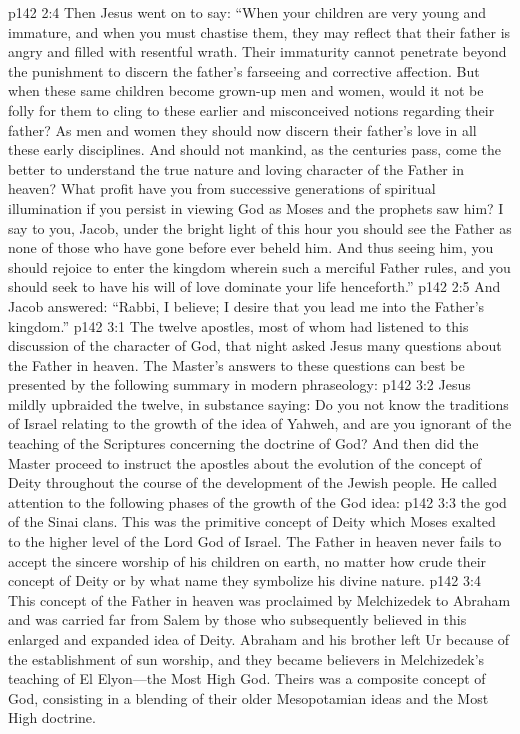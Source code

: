 \pc \vs p142 2:4 Then Jesus went on to say: \textcolor{ubdarkred}{“When your children are very young and immature, and when you must chastise them, they may reflect that their father is angry and filled with resentful wrath. Their immaturity cannot penetrate beyond the punishment to discern the father’s farseeing and corrective affection. But when these same children become grown\hyp{}up men and women, would it not be folly for them to cling to these earlier and misconceived notions regarding their father? As men and women they should now discern their father’s love in all these early disciplines. And should not mankind, as the centuries pass, come the better to understand the true nature and loving character of the Father in heaven? What profit have you from successive generations of spiritual illumination if you persist in viewing God as Moses and the prophets saw him? I say to you, Jacob, under the bright light of this hour you should see the Father as none of those who have gone before ever beheld him. And thus seeing him, you should rejoice to enter the kingdom wherein such a merciful Father rules, and you should seek to have his will of love dominate your life henceforth.”}
\vs p142 2:5 And Jacob answered: “Rabbi, I believe; I desire that you lead me into the Father’s kingdom.”
\vs p142 3:1 The twelve apostles, most of whom had listened to this discussion of the character of God, that night asked Jesus many questions about the Father in heaven. The Master’s answers to these questions can best be presented by the following summary in modern phraseology:
\vs p142 3:2 Jesus mildly upbraided the twelve, in substance saying: Do you not know the traditions of Israel relating to the growth of the idea of Yahweh, and are you ignorant of the teaching of the Scriptures concerning the doctrine of God? And then did the Master proceed to instruct the apostles about the evolution of the concept of Deity throughout the course of the development of the Jewish people. He called attention to the following phases of the growth of the God idea:\plusone
\pc \vs p142 3:3 \bibnobreakspace {}the god of the Sinai clans. This was the primitive concept of Deity which Moses exalted to the higher level of the Lord God of Israel. The Father in heaven never fails to accept the sincere worship of his children on earth, no matter how crude their concept of Deity or by what name they symbolize his divine nature.
\pc \vs p142 3:4 \bibnobreakspace {} This concept of the Father in heaven was proclaimed by Melchizedek to Abraham and was carried far from Salem by those who subsequently believed in this enlarged and expanded idea of Deity. Abraham and his brother left Ur because of the establishment of sun worship, and they became believers in Melchizedek’s teaching of El Elyon---the Most High God. Theirs was a composite concept of God, consisting in a blending of their older Mesopotamian ideas and the Most High doctrine.

